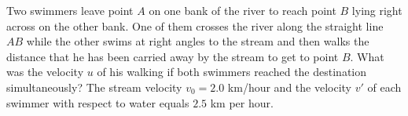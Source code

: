 \item Two swimmers leave point \( A \) on one bank of the river to reach point \( B \) lying right across on the other bank. One of them crosses the river along the straight line \( AB \) while the other swims at right angles to the stream and then walks the distance that he has been carried away by the stream to get to point \( B \). What was the velocity \( u \) of his walking if both swimmers reached the destination simultaneously? The stream velocity \( v_0 = 2.0 \) km/hour and the velocity \( v' \) of each swimmer with respect to water equals \( 2.5 \) km per hour.
